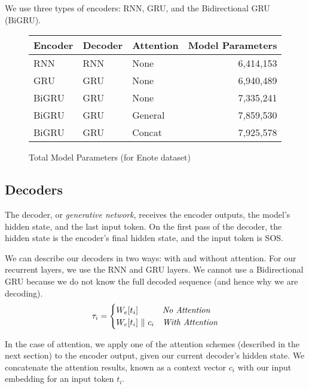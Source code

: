 \documentclass[twoside,twocolumn]{article}
\begin{document}
We use three types of encoders: RNN, GRU, and the Bidirectional GRU (BiGRU).
\begin{figure*}
    \centering
    \begin{tabular}{ |l|l|l|r| }
        \hline
        \textbf{Encoder}
          & \textbf{Decoder}
          & \textbf{Attention}
          & \textbf{Model Parameters}\\
        \hline
        RNN & RNN & None & 6,414,153 \\ \hline
        GRU & GRU & None & 6,940,489 \\ \hline
        BiGRU & GRU & None & 7,335,241 \\ \hline
        BiGRU & GRU & General & 7,859,530 \\ \hline
        BiGRU & GRU & Concat & 7,925,578 \\ \hline
    \end{tabular}

    \caption{Total Model Parameters (for Enote dataset)}
    \label{fig:data-lines-enotes}
\end{figure*}
\subsection{Decoders}
The decoder, or \emph{generative network}, receives the encoder outputs, the
model's hidden state, and the last input token. On the first pass of the
decoder, the hidden state is the encoder's final hidden state, and the
input token is SOS.

We can describe our decoders in two ways: with and without attention. For
our recurrent layers, we use the RNN and GRU layers. We cannot use a
Bidirectional GRU because we do not know the full decoded sequence
(and hence why we are decoding).
\begin{equation}
  \tau_i = \begin{cases}
    W_e[t_i] & \emph{No Attention} \\
    W_e[t_i] \,\, \Vert \,\, c_i & \emph{With Attention} \\
  \end{cases}
\end{equation}

In the case of attention, we apply one of the attention schemes (described in
the next section) to the encoder output, given our current decoder's
hidden state. We concatenate the attention results, known as a context vector
$c_i$ with our input embedding for an input token $t_i$.
\end{document}
